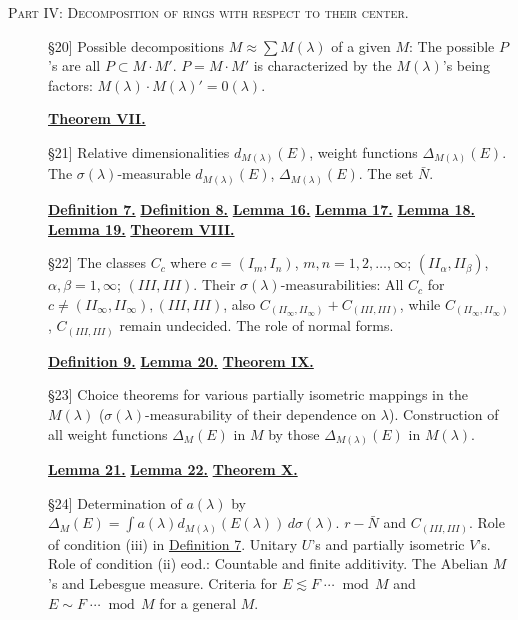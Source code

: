 \documentclass[b5paper,12pt,twoside]{article}
\numberwithin{equation}{section}
\theoremstyle{vnplain}
\theoremstyle{vndefinition}
\newcommand{\tocsec}[1]{\hyperref[sec:#1]{\S#1}}
\newcommand{\vnmod}[1]{\mathrel{\cdots}\operatorname{mod}\,#1}
\begin{document}
\noindent\textsc{Part IV: Decomposition of rings with respect to their center.}
\begin{description}
\item[\tocsec{20}] Possible decompositions
$M\approx\sum M(\lambda)$ of a given $M$: The possible $P$'s are all
$P\subset M\cdot M'$. $P=M\cdot M'$ is characterized by the $M(\lambda)$'s
being factors: $M(\lambda)\cdot M(\lambda)'=0(\lambda)$.
\begin{center}\hyperref[thm:VII]{\textbf{Theorem VII.}}\end{center}
\item[\tocsec{21}] Relative dimensionalities
$d_{M(\lambda)}(E)$, weight functions $\Delta_{M(\lambda)}(E)$. The
$\sigma(\lambda)$-measurable $d_{M(\lambda)}(E)$,
$\Delta_{M(\lambda)}(E)$. The set $\bar N$.
\begin{center}\hyperref[def:7]{\textbf{Definition 7.}}\quad
\hyperref[def:8]{\textbf{Definition 8.}}\quad
\hyperref[lem:16]{\textbf{Lemma 16.}}\quad
\hyperref[lem:17]{\textbf{Lemma 17.}}\quad
\hyperref[lem:18]{\textbf{Lemma 18.}}\quad
\hyperref[lem:19]{\textbf{Lemma 19.}}\quad
\hyperref[thm:VIII]{\textbf{Theorem VIII.}}\end{center}
\item[\tocsec{22}] The classes $C_c$ where
$c=(I_m,I_n)$, $m,n=1,2,\ldots,\infty$; $(II_\alpha,II_\beta)$,
$\alpha,\beta=1,\infty$; $(III,III)$. Their $\sigma(\lambda)$-measurabilities:
All $C_c$ for $c\ne(II_\infty,II_\infty),(III,III)$, also
$C_{(II_\infty,II_\infty)}+C_{(III,III)}$, while
$C_{(II_\infty,II_\infty)}$, $C_{(III,III)}$ remain undecided. The role of
normal forms.
\begin{center}\hyperref[def:9]{\textbf{Definition 9.}}\quad
\hyperref[lem:20]{\textbf{Lemma 20.}}\quad
\hyperref[thm:IX]{\textbf{Theorem IX.}}\end{center}
\item[\tocsec{23}] Choice theorems for various partially isometric
mappings in the $M(\lambda)$ ($\sigma(\lambda)$-measurability of their
dependence on $\lambda$). Construction of all weight functions $\Delta_M(E)$
in $M$ by those $\Delta_{M(\lambda)}(E)$ in $M(\lambda)$.
\begin{center}\hyperref[lem:21]{\textbf{Lemma 21.}}\quad
\hyperref[lem:22]{\textbf{Lemma 22.}}\quad
\hyperref[thm:X]{\textbf{Theorem X.}}\end{center}
\item[\tocsec{24}] Determination of $a(\lambda)$ by
$\Delta_M(E)=\int a(\lambda)d_{M(\lambda)}(E(\lambda))\,d\sigma(\lambda)$.
$r-\bar N$ and $C_{(III,III)}$. Role of condition (iii) in
\hyperref[def:7]{Definition 7}.
Unitary $U$'s and partially isometric $V$'s. Role of condition (ii) eod.:
Countable and finite additivity. The Abelian $M$'s and Lebesgue measure.
Criteria for $E\lesssim F\vnmod{M}$ and $E\sim F\vnmod{M}$ for a general $M$.
\end{description}
\end{document}
